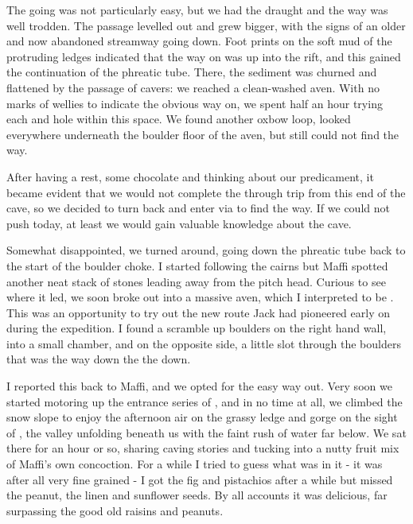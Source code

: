 The going was not particularly easy, but we had the draught and the way was well trodden. The passage levelled out and grew bigger, with the signs of an older and now abandoned streamway going down. Foot prints on the soft mud of the protruding ledges indicated that the way on was up into the rift, and this gained the continuation of the phreatic tube. There, the sediment was churned and flattened by the passage of cavers: we reached a clean-washed aven. With no marks of wellies to indicate the obvious way on, we spent half an hour trying each and hole within this space. We found another oxbow loop, looked everywhere underneath the boulder floor of the aven, but still could not find the way. 

After having a rest, some chocolate and thinking about our predicament, it became evident that we would not complete the through trip from this end of the cave, so we decided to turn back and enter via  to find the way. If we could not push today, at least we would gain valuable knowledge about the cave. 

Somewhat disappointed, we turned around, going down the phreatic tube back to the start of the boulder choke. I started following the cairns but Maffi spotted another neat stack of stones leading away from the pitch head. Curious to see where it led, we soon broke out into a massive aven, which I interpreted to be . This was an opportunity to try out the new route Jack had pioneered early on during the expedition. I found a scramble up boulders on the right hand wall, into a small chamber, and on the opposite side, a little slot through the boulders that was the way down the the  down. 

I reported this back to Maffi, and we opted for the easy way out. Very soon we started motoring up the entrance series of , and in no time at all, we climbed the snow slope to enjoy the afternoon air on the grassy ledge and gorge on the sight of , the  valley unfolding beneath us with the faint rush of water far below. We sat there for an hour or so, sharing caving stories and tucking into a nutty fruit mix of Maffi's own concoction. For a while I tried to guess what was in it - it was after all very fine grained - I got the fig and pistachios after a while but missed the peanut, the linen and sunflower seeds. By all accounts it was delicious, far surpassing the good old raisins and peanuts. 

